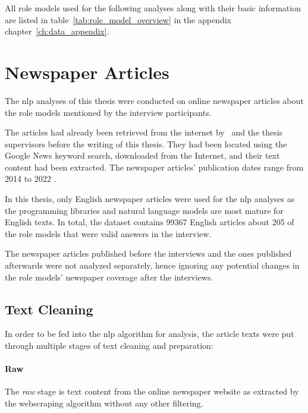 All role models used for the following analyses along with their basic information are listed in table~\ref{tab:role_model_overview} in the appendix chapter~\ref{ch:data_appendix}.


\section{Newspaper Articles}
The \gls{nlp} analyses of this thesis were conducted on online newspaper articles about the role models mentioned by the interview participants.

The articles had already been retrieved from the internet by~\textcite{fenske_using_2022} and the thesis supervisors before the writing of this thesis. They had been located using the Google News keyword search, downloaded from the Internet, and their text content had been extracted. The newspaper articles' publication dates range from 2014 to 2022 \autocite{fenske_using_2022}.

In this thesis, only English newspaper articles were used for the \gls{nlp} analyses as the programming libraries and natural language models are most mature for English texts. In total, the dataset contains \SI{99367}{} English articles about \SI{205}{} of the role models that were valid answers in the interview.

The newspaper articles published before the interviews and the ones published afterwards were not analyzed separately, hence ignoring any potential changes in the role models' newspaper coverage after the interviews.


\subsection*{Text Cleaning}
In order to be fed into the \gls{nlp} algorithm for analysis, the article texts were put through multiple stages of text cleaning and preparation:

\paragraph{Raw} The \textit{raw} stage is text content from the online newspaper website as extracted by the webscraping algorithm without any other filtering.

